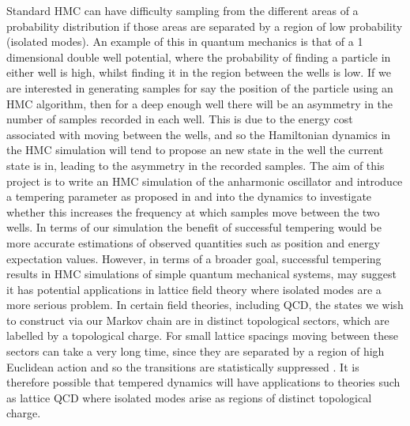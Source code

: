 \documentclass[12pt]{article}
\begin{document}
 Standard HMC can have difficulty sampling from the different areas of a probability distribution if those areas are separated by a region of low probability (isolated modes). An example of this in quantum mechanics is that of a 1 dimensional double well potential, where the probability of finding a particle in either well is high, whilst finding it in the region between the wells is low. If we are interested in generating samples for say the position of the particle using an HMC algorithm, then for a deep enough well there will be an asymmetry in the number of samples recorded in each well. This is due to the energy cost associated with moving between the wells, and so the Hamiltonian dynamics in the HMC simulation will tend to propose an new state in the well the current state is in, leading to the asymmetry in the recorded samples. The aim of this project is to write an HMC simulation of the anharmonic oscillator and introduce a tempering parameter as proposed in \cite{neal_1996_b} and \cite{neal_2011} into the dynamics to investigate whether this increases the frequency at which samples move between the two wells. In terms of our simulation the benefit of successful tempering would be more accurate estimations of observed quantities such as position and energy expectation values. However, in terms of a broader goal, successful tempering results in HMC simulations of simple quantum mechanical systems, may suggest it has potential applications in lattice field theory where isolated modes are a more serious problem. In certain field theories, including QCD, the states we wish to construct via our Markov chain are in distinct topological sectors, which are labelled by a topological charge. For small lattice spacings moving between these sectors can take a very long time, since they are separated by a region of high Euclidean action and so the transitions are statistically suppressed \cite{bietenholz_2016}. It is therefore possible that tempered dynamics will have applications to theories such as lattice QCD where isolated modes arise as regions of distinct topological charge.
\end{document}
